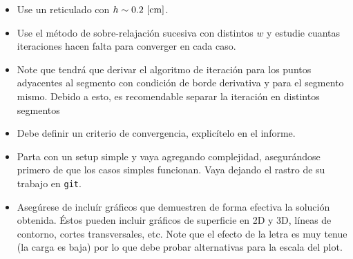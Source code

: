 \documentclass[letter, 11pt]{article}
\begin{document}
\begin{ayuda}


  \begin{itemize}

    \item Use un reticulado con $h\sim0.2~{\rm [cm]}$.

    \item Use el método de sobre-relajación sucesiva con distintos $w$ y
      estudie cuantas iteraciones hacen falta para converger en cada caso.

    \item Note que tendrá que derivar el algoritmo de iteración para los puntos
      adyacentes al segmento con condición de borde derivativa y para el
      segmento mismo.  Debido a esto, es recomendable separar la iteración en
      distintos segmentos

    \item Debe definir un criterio de convergencia, explicítelo en el informe.

    \item Parta con un setup simple y vaya agregando complejidad, asegurándose
      primero de que los casos simples funcionan. Vaya dejando el rastro de su
      trabajo en \texttt{git}.

    \item Asegúrese de incluír gráficos que demuestren de forma efectiva la
      solución obtenida. Éstos pueden incluir gráficos de superficie en 2D y
      3D, líneas de contorno, cortes transversales, etc. Note que el efecto de
      la letra es muy tenue (la carga es baja) por lo que debe probar
      alternativas para la escala del plot.

  \end{itemize}


\end{ayuda}
\end{document}
